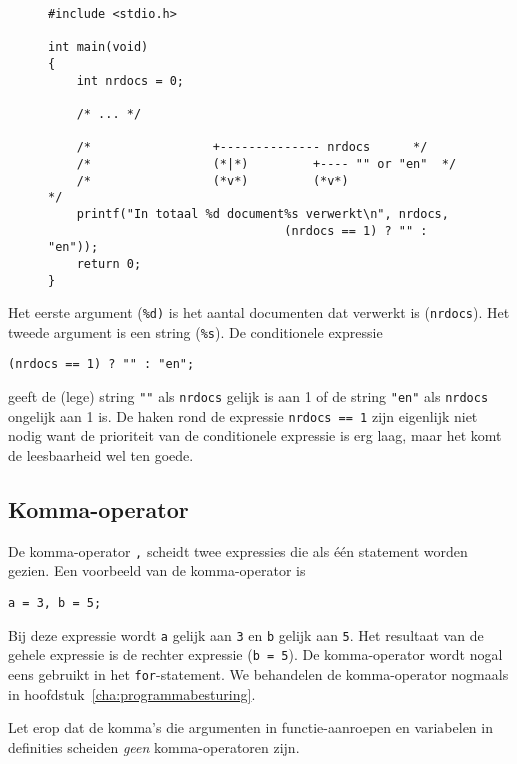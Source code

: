 \begin{figure}[!ht]
\begin{lstlisting}[caption=Het afdrukken van een meervoudsvorm.,label=cod:varnrdocs]
#include <stdio.h>

int main(void)
{
    int nrdocs = 0;

    /* ... */
    
    /*                 +-------------- nrdocs      */
    /*                 (*|*)         +---- "" or "en"  */
    /*                 (*v*)         (*v*)                 */
    printf("In totaal %d document%s verwerkt\n", nrdocs,
                                 (nrdocs == 1) ? "" : "en"));
    return 0;
}
\end{lstlisting}
\end{figure} 

Het eerste argument (\texttt{\%d)} is het aantal documenten dat verwerkt is (\texttt{nrdocs}). Het tweede argument is een string (\texttt{\%s}). De conditionele expressie

\begin{lstlisting}[style=lstoneline]
(nrdocs == 1) ? "" : "en";
\end{lstlisting}

geeft de (lege) string \lstinline[basicstyle=\ttfamily]|""| als \texttt{nrdocs} gelijk is aan 1 of de string \lstinline[basicstyle=\ttfamily]|"en"| als \texttt{nrdocs} ongelijk aan 1 is. De haken rond de expressie \texttt{nrdocs == 1} zijn eigenlijk niet nodig want de prioriteit van de conditionele expressie is erg laag, maar het komt de leesbaarheid wel ten goede.

\subsection{Komma-operator}
De komma-operator\indexop{,} \texttt{,} scheidt twee expressies die als één statement worden gezien. Een voorbeeld van de komma-operator is

\hspace*{1em}\texttt{a = 3, b = 5;}

Bij deze expressie wordt \texttt{a} gelijk aan \texttt{3} en \texttt{b} gelijk aan \texttt{5}. Het resultaat van de gehele expressie is de rechter expressie (\texttt{b = 5}). De komma-operator wordt nogal eens gebruikt in het \texttt{for}-statement. We behandelen de komma-operator nogmaals in hoofdstuk~\ref{cha:programmabesturing}.

Let erop dat de komma's die argumenten in functie-aanroepen en variabelen in definities scheiden \textsl{geen} komma-operatoren zijn.

